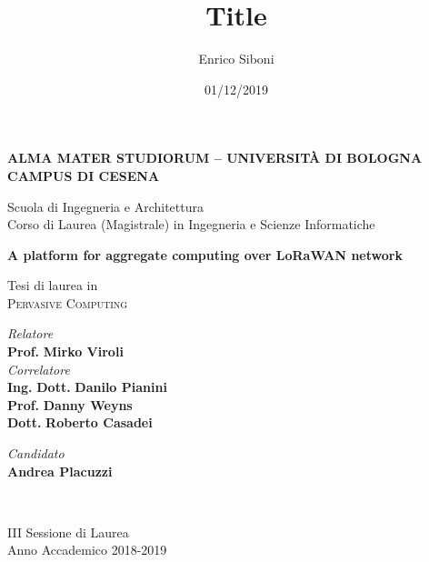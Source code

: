 \title{Title}
\author{Enrico Siboni}
\date{01/12/2019}

\begin{titlepage}
	\begin{center}
		
		\large
		\textbf{ALMA MATER STUDIORUM -- UNIVERSITÀ DI BOLOGNA \\ CAMPUS DI CESENA}
		\\
		\noindent\hrulefill
		\vspace{0.4cm}
		
		\Large
		Scuola di Ingegneria e Architettura \\
		Corso di Laurea (Magistrale) in Ingegneria e Scienze Informatiche
		
		\Huge
		\vspace{4cm}
		\textbf{
		  A platform for aggregate computing over LoRaWAN network
		}
		
		\large
		\vspace{1cm}
		Tesi di laurea in 
		\\
		\textsc{Pervasive Computing}
		
		\vspace{5.5cm}
		\begin{minipage}[t]{0.64\textwidth}
			\begin{flushleft}
				\textit{Relatore} 
				\\ 
				\textbf{Prof.} \textbf{Mirko Viroli}
				\\
				\vspace{0.4cm}
				\textit{Correlatore} 
				\\
				\textbf{Ing.} \textbf{Dott.} \textbf{Danilo Pianini}
				\\
				\textbf{Prof.} \textbf{Danny Weyns}
				\\
				\textbf{Dott.} \textbf{Roberto Casadei}
			\end{flushleft}
		\end{minipage}
		\begin{minipage}[t]{0.34\textwidth}
			\begin{flushright}
				\textit{Candidato} 
				\\ 
				\textbf{Andrea Placuzzi}
			\end{flushright}
		\end{minipage}\\
		
		\vfill
		\noindent\hrulefill
		\vspace{0.3cm}
		\Large
		
		III Sessione di Laurea
		\\
		Anno Accademico 2018-2019
	\end{center}
\end{titlepage}
\restoregeometry